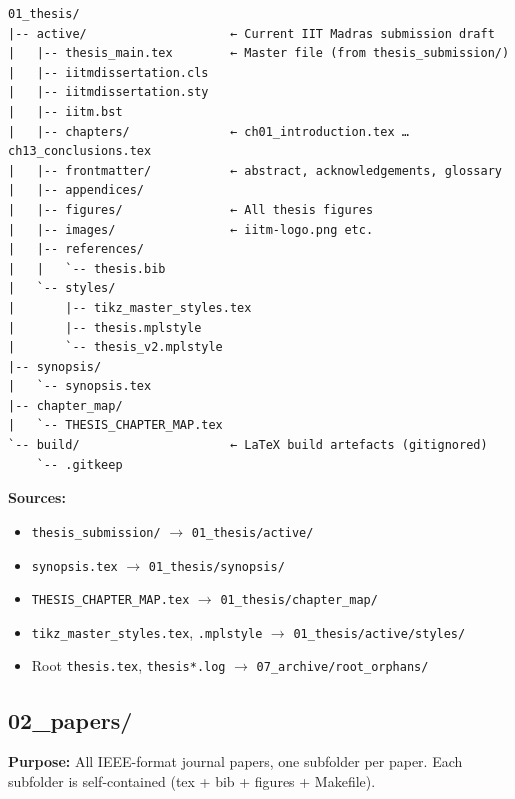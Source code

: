\documentclass[11pt,a4paper]{article}
\newcommand{\cmd}[1]{\texttt{\small #1}}
\begin{document}
\begin{verbatim}
01_thesis/
|-- active/                    ← Current IIT Madras submission draft
|   |-- thesis_main.tex        ← Master file (from thesis_submission/)
|   |-- iitmdissertation.cls
|   |-- iitmdissertation.sty
|   |-- iitm.bst
|   |-- chapters/              ← ch01_introduction.tex … ch13_conclusions.tex
|   |-- frontmatter/           ← abstract, acknowledgements, glossary
|   |-- appendices/
|   |-- figures/               ← All thesis figures
|   |-- images/                ← iitm-logo.png etc.
|   |-- references/
|   |   `-- thesis.bib
|   `-- styles/
|       |-- tikz_master_styles.tex
|       |-- thesis.mplstyle
|       `-- thesis_v2.mplstyle
|-- synopsis/
|   `-- synopsis.tex
|-- chapter_map/
|   `-- THESIS_CHAPTER_MAP.tex
`-- build/                     ← LaTeX build artefacts (gitignored)
    `-- .gitkeep
\end{verbatim}

\textbf{Sources:}
\begin{itemize}[noitemsep]
  \item \cmd{thesis\_submission/} $\to$ \cmd{01\_thesis/active/}
  \item \cmd{synopsis.tex} $\to$ \cmd{01\_thesis/synopsis/}
  \item \cmd{THESIS\_CHAPTER\_MAP.tex} $\to$ \cmd{01\_thesis/chapter\_map/}
  \item \cmd{tikz\_master\_styles.tex}, \cmd{*.mplstyle} $\to$ \cmd{01\_thesis/active/styles/}
  \item Root \cmd{thesis.tex}, \cmd{thesis*.log} $\to$ \cmd{07\_archive/root\_orphans/}
\end{itemize}

\subsection{02\_papers/}

\begin{greenbox}
\textbf{Purpose:} All IEEE-format journal papers, one subfolder per paper.
Each subfolder is self-contained (tex + bib + figures + Makefile).
\end{greenbox}
\end{document}
